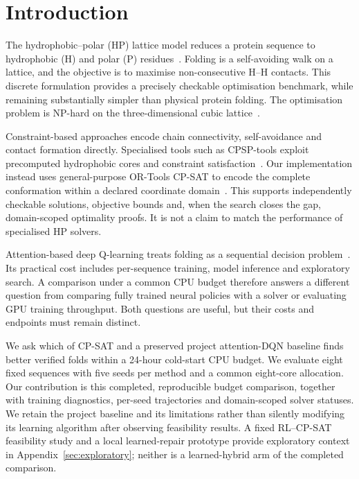 \documentclass{article}
\theoremstyle{plain}
\theoremstyle{definition}
\begin{document}
\section{Introduction}
The hydrophobic--polar (HP) lattice model reduces a protein sequence to hydrophobic (H) and polar (P) residues~\cite{Dill1985,Lau1989}. Folding is a self-avoiding walk on a lattice, and the objective is to maximise non-consecutive H--H contacts. This discrete formulation provides a precisely checkable optimisation benchmark, while remaining substantially simpler than physical protein folding. The optimisation problem is NP-hard on the three-dimensional cubic lattice~\cite{BergerLeighton1998}.

Constraint-based approaches encode chain connectivity, self-avoidance and contact formation directly. Specialised tools such as CPSP-tools exploit precomputed hydrophobic cores and constraint satisfaction~\cite{CPSP2009}. Our implementation instead uses general-purpose OR-Tools CP-SAT to encode the complete conformation within a declared coordinate domain~\cite{GoogleORTools,Perron2023}. This supports independently checkable solutions, objective bounds and, when the search closes the gap, domain-scoped optimality proofs. It is not a claim to match the performance of specialised HP solvers.

Attention-based deep Q-learning treats folding as a sequential decision problem~\cite{AttnDRL2504}. Its practical cost includes per-sequence training, model inference and exploratory search. A comparison under a common CPU budget therefore answers a different question from comparing fully trained neural policies with a solver or evaluating GPU training throughput. Both questions are useful, but their costs and endpoints must remain distinct.

We ask which of CP-SAT and a preserved project attention-DQN baseline finds better verified folds within a 24-hour cold-start CPU budget. We evaluate eight fixed sequences with five seeds per method and a common eight-core allocation. Our contribution is this completed, reproducible budget comparison, together with training diagnostics, per-seed trajectories and domain-scoped solver statuses. We retain the project baseline and its limitations rather than silently modifying its learning algorithm after observing feasibility results. A fixed RL--CP-SAT feasibility study and a local learned-repair prototype provide exploratory context in Appendix~\ref{sec:exploratory}; neither is a learned-hybrid arm of the completed comparison.
\end{document}
